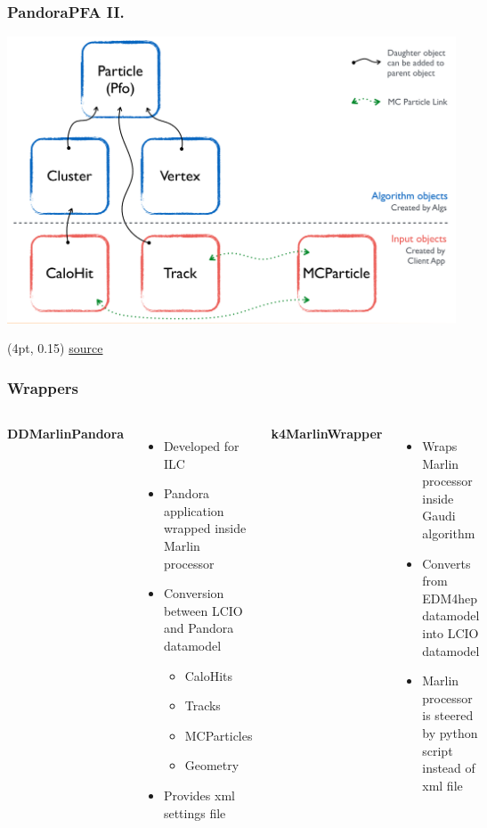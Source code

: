\documentclass[aspectratio=169]{beamer}
\newcommand{\bluetext}[1]{%
  \textcolor{myBlue}{#1}
}
\begin{document}
\begin{frame}
  \frametitle{PandoraPFA II.}

  \begin{center}
    \includegraphics[width=.8\textwidth]{figures/pandora_edm.pdf}
  \end{center}

  \begin{textblock*}{\paperwidth}(4pt, 0.15\textheight)
    \tiny
    \href{https://github.com/PandoraPFA/Documentation/blob/master/Pandora_Example.pdf}
         {source}
  \end{textblock*}
\end{frame}


\begin{frame}
  \frametitle{Wrappers}

  \begin{columns}[c]

    \bluetext{\bf DDMarlinPandora}

    \begin{itemize}
      \item Developed for ILC
      \item Pandora application wrapped inside Marlin processor
      \item Conversion between LCIO and Pandora datamodel
            \begin{itemize}
              \item CaloHits
              \item Tracks
              \item MCParticles
              \item Geometry
            \end{itemize}
      \item Provides xml settings file
    \end{itemize}


    \bluetext{\bf k4MarlinWrapper}
    \begin{itemize}
      \item Wraps Marlin processor inside Gaudi algorithm
      \item Converts from EDM4hep datamodel into LCIO datamodel
      \item Marlin processor is steered by python script instead of xml file
    \end{itemize}
  \end{columns}


\end{frame}
\end{document}
